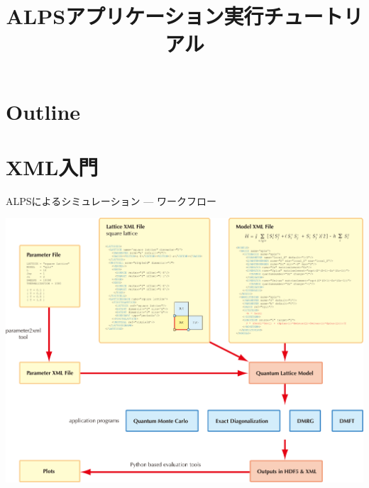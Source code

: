 \title{ALPSアプリケーション実行チュートリアル}




\begin{frame}
  \titlepage
\end{frame}

\section*{Outline}
\begin{frame}
   \tableofcontents
\end{frame}

\section{XML入門}

\begin{frame}{ALPSによるシミュレーション --- ワークフロー}
  \begin{center}
    \includegraphics[height=0.8\textheight]{workflow.pdf}
  \end{center}
\end{frame}

